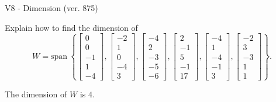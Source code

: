 \begin{exercise}
  \begin{exerciseTitle}V8 - Dimension (ver. 875)\end{exerciseTitle}
  \begin{exerciseStatement}
    Explain how to find the dimension of 
\[W=\mathrm{span}\ \left\{\left[\begin{array}{r}
0 \\
0 \\
-1 \\
1 \\
-4
\end{array}\right] , \left[\begin{array}{r}
-2 \\
1 \\
0 \\
-4 \\
3
\end{array}\right] , \left[\begin{array}{r}
-4 \\
2 \\
-3 \\
-5 \\
-6
\end{array}\right] , \left[\begin{array}{r}
2 \\
-1 \\
5 \\
-1 \\
17
\end{array}\right] , \left[\begin{array}{r}
-4 \\
1 \\
-4 \\
-1 \\
3
\end{array}\right] , \left[\begin{array}{r}
-2 \\
3 \\
-3 \\
1 \\
1
\end{array}\right]\right\}.\]



  \end{exerciseStatement}
  \begin{exerciseAnswer}
   The dimension of \(W\) is  \(4\).
  


  \end{exerciseAnswer}
\end{exercise}